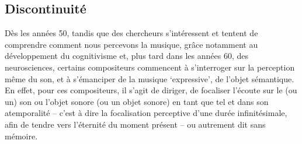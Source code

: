 \documentclass{article}
\begin{document}


\subsection{Discontinuité}


Dès les années 50, tandis que des chercheurs s'intéressent et tentent de comprendre comment nous percevons la musique, grâce notamment au développement du cognitivisme et, plus tard dans les années 60, des neurosciences, certains compositeurs commencent à s'interroger sur la perception même du son, et à s'émanciper de la musique `expressive', de l'objet sémantique. En effet, pour ces compositeurs, il s'agit de diriger, de focaliser l'écoute sur le (ou un) son ou l'objet sonore (ou un objet sonore) en tant que tel et dans son atemporalité -- c'est à dire la focalisation perceptive d'une durée infinitésimale, afin de tendre vers l'éternité du moment présent -- ou autrement dit sans mémoire.  

%
%
%
\end{document}
